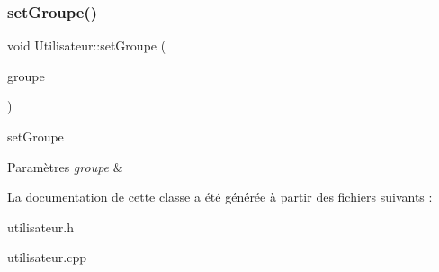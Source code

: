 \subsubsection{\texorpdfstring{set\+Groupe()}{setGroupe()}}
{\footnotesize\ttfamily void Utilisateur\+::set\+Groupe (\begin{DoxyParamCaption}\item[{Q\+String}]{groupe }\end{DoxyParamCaption})}



set\+Groupe 


\begin{DoxyParams}{Paramètres}
{\em groupe} & \\
\hline
\end{DoxyParams}


La documentation de cette classe a été générée à partir des fichiers suivants \+:\begin{DoxyCompactItemize}
\item 
utilisateur.\+h\item 
utilisateur.\+cpp\end{DoxyCompactItemize}
